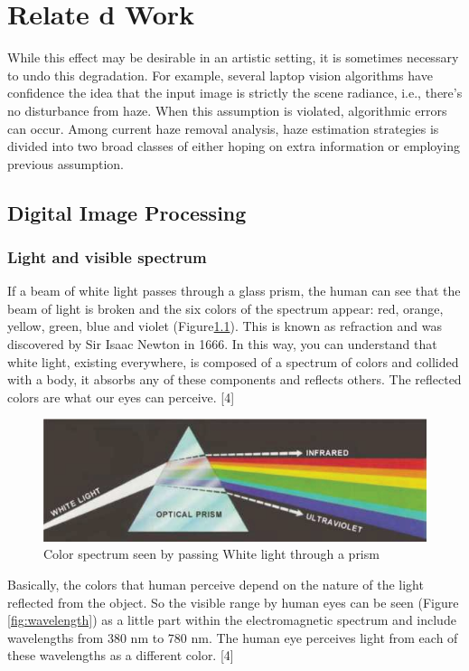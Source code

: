\chapter{Relate d Work}
While this effect may be desirable in an artistic setting, it is sometimes necessary to undo this degradation. For example, several laptop vision algorithms have confidence the idea that the input image is strictly the scene radiance, i.e., there’s no disturbance from haze. When this assumption is violated, algorithmic errors can occur. Among current haze removal analysis, haze estimation strategies is divided into two broad classes of either hoping on extra information or employing previous assumption.

\section{Digital Image Processing}
\subsection{Light and visible spectrum}
If a beam of white light passes through a glass prism, the human can see that the beam of light is broken and the six colors of the spectrum appear: red, orange, yellow, green, blue and violet (Figure\ref{fig:colorSpectrum}). This is known as refraction and was discovered by Sir Isaac Newton in 1666. In this way, you can understand that white light, existing everywhere, is composed of a spectrum of colors and collided with a body, it absorbs any of these components and reflects others. The reflected colors are what our eyes can perceive. [4]
\begin{figure}
  \includegraphics[width=\linewidth]{images/ch2/colorSpectrum.jpg}
  \caption{Color spectrum seen by passing White light through a prism}
  \label{fig:colorSpectrum}
\end{figure}

Basically, the colors that human perceive depend on the nature of the light reflected from the object. So the visible range by human eyes can be seen (Figure \ref{fig:wavelength}) as a little part within the electromagnetic spectrum and include wavelengths from 380 nm to 780 nm. The human eye perceives light from each of these wavelengths as a different color. [4]


